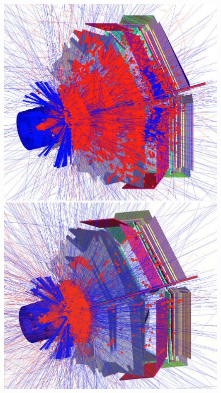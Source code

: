 \documentclass[final,3p,twocolumn]{elsarticle}
\begin{document}
 
\begin{figure}[htbp!]
\centerline{
	\includegraphics[width=1.0\columnwidth, height=1.0\columnwidth]{NoField.png}
	\includegraphics[width=1.0\columnwidth, height=1.0\columnwidth]{NoSolenoidFullTorus.png}
}
\end{figure}
\end{document}
